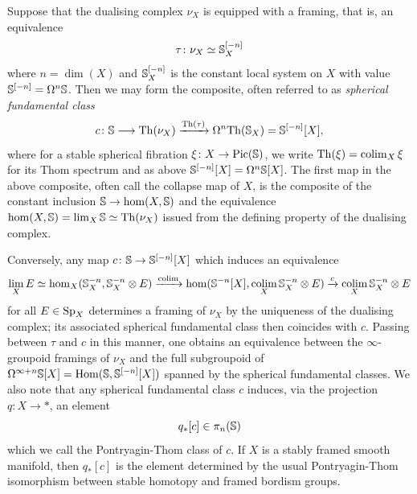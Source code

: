 \begin{remark}
\label{rem:framings}%
Suppose that the dualising complex $\nu_X$ is equipped with a framing, that is, an equivalence  %
\[
\tau\colon \nu_X \simeq \mathbb{S}_X^{[-n]}
\]
where $n=\dim(X)$ and $\mathbb{S}_X^{[-n]}$ is the constant local system on $X$ with value $\mathbb{S}^{[-n]} = \Omega^n\mathbb{S}$.
Then we may form the composite, often referred to as \emph{spherical fundamental class} %
\[
c\colon \mathbb{S} \longrightarrow \mathrm{Th}(\nu_X) \xrightarrow{\mathrm{Th}(\tau)} \Omega^n\mathrm{Th}(\mathbb{S}_X) = \mathbb{S}^{[-n]}[X], 
\]
where for a stable spherical fibration $\xi\colon X\to \operatorname{Pic}(\mathbb{S})$, we write $\mathrm{Th}(\xi) = \mathop{\mathrm{colim}}_X \xi$ for its Thom spectrum and as above $\mathbb{S}^{[-n]}[X] = \Omega^n\mathbb{S}[X]$. The first map in the above composite, often call the collapse map of $X$, is the composite of the constant inclusion $\mathbb{S}\to \operatorname{hom}(X, \mathbb{S})$ and the equivalence $\operatorname{hom}(X, \mathbb{S})=\lim_X \mathbb{S}\simeq \mathrm{Th}(\nu_X)$ issued from the defining property of the dualising complex. 


Conversely, any map $c\colon \mathbb{S} \to \mathbb{S}^{[-n]}[X]$ which induces an equivalence
\[
\lim_X E \simeq \operatorname{hom}_X(\mathbb{S}^{-n}_X,\mathbb{S}^{-n}_X \otimes E) \xrightarrow{\mathop{\mathrm{colim}}} \operatorname{hom}(\mathbb{S}^{-n}[X], \mathop{\mathrm{colim}}_X \mathbb{S}_X^{-n} \otimes E) \xrightarrow{c} \mathop{\mathrm{colim}}_X \mathbb S^{-n}_X \otimes E
\]
for all $E \in \mathrm{Sp}_X$ determines a framing of $\nu_X$ by the uniqueness of the dualising complex; its associated spherical fundamental class then coincides with $c$. Passing between $\tau$ and $c$ in this manner, one obtains an equivalence between the $\infty$-groupoid framings of $\nu_X$ and the full subgroupoid of $\Omega^{\infty+n} \mathbb{S}[X] = \operatorname{Hom}(\mathbb{S},\mathbb{S}^{[-n]}[X])$ spanned by the spherical fundamental classes. %
We also note that any spherical fundamental class $c$ induces, %
via the projection $q\colon X\to *$, an element 
\[
q_*[c]\in \pi_n(\mathbb{S})
\]
which we call the Pontryagin-Thom class of $c$.
If $X$ is a stably framed smooth manifold, then $q_*[c]$ is the element determined by the usual Pontryagin-Thom isomorphism between stable homotopy and framed bordism groups.  
\end{remark}

